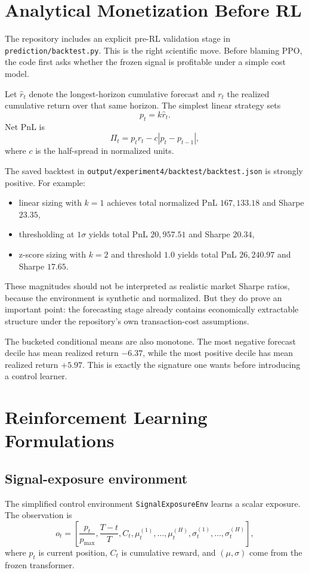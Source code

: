\documentclass[11pt]{article}
\begin{document}
\section{Analytical Monetization Before RL}
The repository includes an explicit pre-RL validation stage in \texttt{prediction/backtest.py}. This is the right scientific move. Before blaming PPO, the code first asks whether the frozen signal is profitable under a simple cost model.

Let \(\hat{r}_t\) denote the longest-horizon cumulative forecast and \(r_t\) the realized cumulative return over that same horizon. The simplest linear strategy sets
\[
p_t = k \hat{r}_t.
\]
Net PnL is
\[
\Pi_t = p_t r_t - c |p_t - p_{t-1}|,
\]
where \(c\) is the half-spread in normalized units.

The saved backtest in \texttt{output/experiment4/backtest/backtest.json} is strongly positive. For example:
\begin{itemize}
\item linear sizing with \(k=1\) achieves total normalized PnL \(167{,}133.18\) and Sharpe \(23.35\),
\item thresholding at \(1\sigma\) yields total PnL \(20{,}957.51\) and Sharpe \(20.34\),
\item z-score sizing with \(k=2\) and threshold \(1.0\) yields total PnL \(26{,}240.97\) and Sharpe \(17.65\).
\end{itemize}

These magnitudes should not be interpreted as realistic market Sharpe ratios, because the environment is synthetic and normalized. But they do prove an important point: the forecasting stage already contains economically extractable structure under the repository's own transaction-cost assumptions.

The bucketed conditional means are also monotone. The most negative forecast decile has mean realized return \(-6.37\), while the most positive decile has mean realized return \(+5.97\). This is exactly the signature one wants before introducing a control learner.

\section{Reinforcement Learning Formulations}
\subsection{Signal-exposure environment}
The simplified control environment \texttt{SignalExposureEnv} learns a scalar exposure. The observation is
\[
o_t =
\left[
\frac{p_t}{p_{\max}},
\frac{T-t}{T},
C_t,
\mu_t^{(1)},\ldots,\mu_t^{(H)},
\sigma_t^{(1)},\ldots,\sigma_t^{(H)}
\right],
\]
where \(p_t\) is current position, \(C_t\) is cumulative reward, and \((\mu,\sigma)\) come from the frozen transformer.
\end{document}
